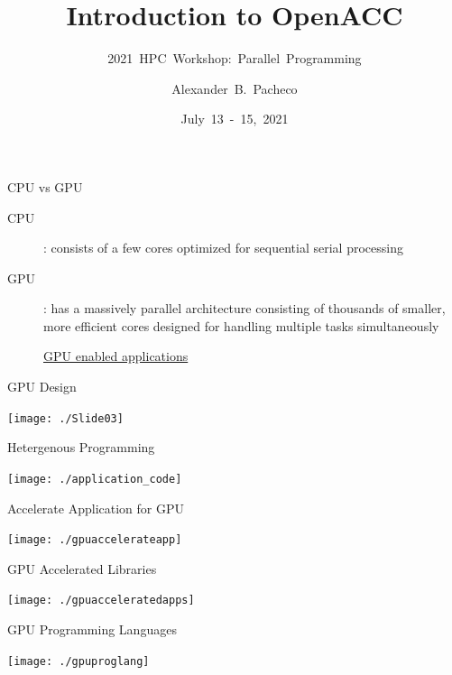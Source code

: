 \documentclass[10pt,t]{beamer}
\title{Introduction to OpenACC}
\subtitle{2021~HPC~Workshop:~Parallel~Programming}
\author{\large{Alexander~B.~Pacheco}}
\institute[Lehigh University Research Computing]{\href{http://researchcomputing.lehigh.edu}{Research~Computing}}
\date{July~13~-~15,~2021}
\begin{document}
\begin{frame}
  \titlepage
\end{frame}

\begin{frame}{CPU vs GPU}
  \begin{description}
    \item[CPU]: consists of a few cores optimized for sequential serial processing
    \item[GPU]: has a massively parallel architecture consisting of thousands of smaller, more efficient cores designed for handling multiple tasks simultaneously
    \item[] \href{http://www.nvidia.com/object/gpu-applications.html}{GPU enabled applications}
  \end{description}
\end{frame}

\begin{frame}{GPU Design}
  \vspace{0.25cm}
  \begin{center}
    \texttt{[image: ./Slide03]}
  \end{center}
\end{frame}

\begin{frame}{Hetergenous Programming}
  \begin{center}
    \texttt{[image: ./application\_code]}
  \end{center}
\end{frame}

\begin{frame}{Accelerate Application for GPU}
  \begin{center}
    \texttt{[image: ./gpuaccelerateapp]}
  \end{center}
\end{frame}

\begin{frame}{GPU Accelerated Libraries}
  \begin{center}
    \texttt{[image: ./gpuacceleratedapps]}
  \end{center}
\end{frame}

\begin{frame}{GPU Programming Languages}
  \begin{center}
    \texttt{[image: ./gpuproglang]}
  \end{center}
\end{frame}
\end{document}
